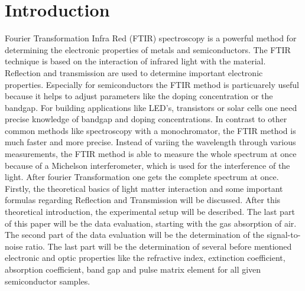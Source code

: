 \section{Introduction}
Fourier Transformation Infra Red (FTIR) spectroscopy is a powerful method for determining
the electronic properties of metals and semiconductors. The FTIR technique is based on the
interaction of infrared light with the material. Reflection and transmission are used to determine 
important electronic properties. Especially for semiconductors the FTIR method
is particuarely useful because it helps to adjust parameters like the doping concentration or
the bandgap. For building applications like LED's, transistors or solar cells one need precise knowledge 
of bandgap and doping concentrations. In contrast to other common methods like spectroscopy with
a monochromator, the FTIR method is much faster and more precise. Instead of variing the wavelength
through various measurements, the FTIR method is able to measure the whole spectrum at once because
of a Michelson interferometer, which is used for the interference of the light. After fourier Transformation
one gets the complete spectrum at once.
Firstly, the theoretical basics of light matter interaction and some important formulas regarding
Reflection and Transmission will be discussed. After this theoretical introduction, the experimental
setup will be described. The last part of this paper will be the data evaluation, starting with the
gas absorption of air. The second part of the data evaluation will be the determination of the signal-to-noise
ratio. The last part will be the determination of several before mentioned electronic and optic properties
like the refractive index, extinction coefficient, absorption coefficient, band gap and pulse matrix element
for all given semiconductor samples.